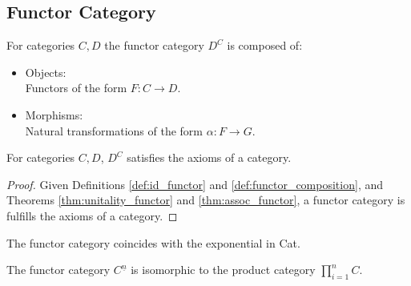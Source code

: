 \subsection{Functor Category}
\begin{definition}
  For categories $C, D$ the functor category $D^C$ is composed of:
  \parencite{leinster:basic_category_theory}
  \begin{itemize}
    \item Objects:\\
      Functors of the form $F:C\to D$.
    \item Morphisms:\\
      Natural transformations of the form $\alpha:F\to G$.
  \end{itemize}
\end{definition}

\begin{theorem}
  For categories $C, D$, $D^C$ satisfies the axioms of a category.

  \begin{proof}
    Given Definitions \ref{def:id_functor} and \ref{def:functor_composition},
    and Theorems \ref{thm:unitality_functor} and \ref{thm:assoc_functor}, a
    functor category is fulfills the axioms of a category.
  \end{proof}
\end{theorem}

\begin{remark}
  The functor category coincides with the exponential in Cat.
\end{remark}

\begin{remark}
  The functor category $C^{\underline{n}}$ is isomorphic to the product category
  $\prod_{i=1}^n C$.
\end{remark}